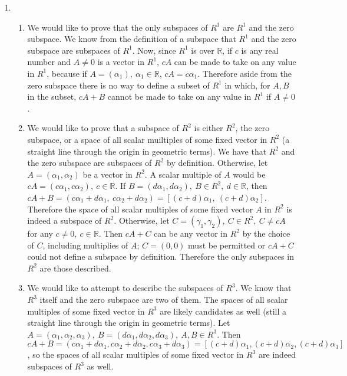 \documentclass[12pt]{article}
\begin{document}
\begin{enumerate}
        \item
          \begin{enumerate}
            \item
              We would like to prove that the only subspaces of $R^1$ are $R^1$ and
              the zero subspace. We know from the definition of a subspace that $R^1$
              and the zero subspace are subspaces of $R^1$. Now, since $R^1$ is over
              $\mathbb{R}$, if $c$ is any real number and $A \neq 0$ is a vector in
              $R^1$, $cA$ can be made to take on any value in $R^1$, because if $A =
              (\alpha_1),\ \alpha_1 \in \mathbb{R}$, $cA = c\alpha_1$. Therefore
              aside from the zero subspace there is no way to define a subset of
              $R^1$ in which, for $A,B$ in the subset, $cA + B$ cannot be made to
              take on any value in $R^1$ if $A \neq 0$.
            \item
              We would like to prove that a subspace of $R^2$ is either $R^2$, the
              zero subspace, or a space of all scalar muiltiples of some fixed vector
              in $R^2$ (a straight line through the origin in geometric terms). We
              have that $R^2$ and the zero subspace are subspaces of $R^2$ by
              definition. Otherwise, let $A = (\alpha_1,\alpha_2)$ be a vector in
              $R^2$. A scalar multiple of $A$ would be $cA = (c\alpha_1,c\alpha_2),\
              c \in \mathbb{R}$.  If $B = (d\alpha_1,d\alpha_2),\ B \in R^2,\ d \in
              \mathbb{R}$, then $cA + B = (c\alpha_1+d\alpha_1,\ c\alpha_2+d\alpha_2)
              = [(c+d)\alpha_1,\ (c+d)\alpha_2]$. Therefore the space of all scalar
              multiples of some fixed vector $A$ in $R^2$ is indeed a subspace of
              $R^2$. Otherwise, let $C = (\gamma_1,\gamma_2),\ C \in R^2,\ C \neq cA$
              for any $c \neq 0,\ c \in \mathbb{R}$. Then $cA + C$ can be any vector
              in $R^2$ by the choice of $C$, including multiplies of $A$; $C = (0,0)$
              must be permitted or $cA + C$ could not define a subspace by
              definition. Therefore the only subspaces in $R^2$ are those described.
            \item
              We would like to attempt to describe the subspaces of $R^3$. We know
              that $R^3$ itself and the zero subspace are two of them. The spaces of
              all scalar multiples of some fixed vector in $R^3$ are likely
              candidates as well (still a straight line through the origin in
              geometric terms). Let $A = (\alpha_1,\alpha_2,\alpha_3),\ B =
              (d\alpha_1,d\alpha_2,d\alpha_3),\ A,B \in R^3$. Then $cA + B =
              (c\alpha_1+d\alpha_1,c\alpha_2+d\alpha_2,c\alpha_3+d\alpha_3) =
              [(c+d)\alpha_1,(c+d)\alpha_2,(c+d)\alpha_3]$, so the spaces of all
              scalar multiples of some fixed vector in $R^3$ are indeed subspaces of
              $R^3$ as well.


\end{enumerate}
\end{enumerate}
\end{document}
